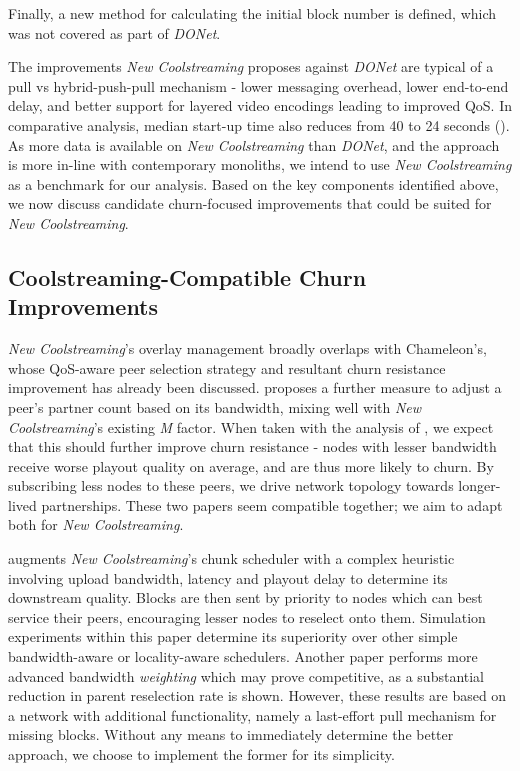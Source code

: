 \documentclass[12pt,a4paper]{article}
\begin{document}
Finally, a new method for calculating the initial block number is defined, which was not covered as part of \textit{DONet}.

The improvements \textit{New Coolstreaming} proposes against \textit{DONet} are typical of a pull vs hybrid-push-pull mechanism - lower messaging overhead, lower end-to-end delay, and better support for layered video encodings leading to improved QoS. In comparative analysis, median start-up time also reduces from 40 to 24 seconds (\cite{Li2007}). As more data is available on \textit{New Coolstreaming} than \textit{DONet}, and the approach is more in-line with contemporary monoliths, we intend to use \textit{New Coolstreaming} as a benchmark for our analysis. Based on the key components identified above, we now discuss candidate churn-focused improvements that could be suited for \textit{New Coolstreaming}.

\subsection{Coolstreaming-Compatible Churn Improvements} \label{litreview:specifics}
\textit{New Coolstreaming}'s overlay management broadly overlaps with Chameleon's, whose QoS-aware peer selection strategy and resultant churn resistance improvement has already been discussed. \cite{Wang2013} proposes a further measure to adjust a peer's partner count based on its bandwidth, mixing well with \textit{New Coolstreaming}'s existing \textit{M} factor. When taken with the analysis of \cite{Vassilakis2010}, we expect that this should further improve churn resistance - nodes with lesser bandwidth receive worse playout quality on average, and are thus more likely to churn. By subscribing less nodes to these peers, we drive network topology towards longer-lived partnerships. These two papers seem compatible together; we aim to adapt both for \textit{New Coolstreaming}.

\cite{Ho2014} augments \textit{New Coolstreaming}'s chunk scheduler with a complex heuristic involving upload bandwidth, latency and playout delay to determine its downstream quality. Blocks are then sent by priority to nodes which can best service their peers, encouraging lesser nodes to reselect onto them. Simulation experiments within this paper determine its superiority over other simple bandwidth-aware or locality-aware schedulers. Another paper \cite{Li2010} performs more advanced bandwidth \textit{weighting} which may prove competitive, as a substantial reduction in parent reselection rate is shown. However, these results are based on a network with additional functionality, namely a last-effort pull mechanism for missing blocks. Without any means to immediately determine the better approach, we choose to implement the former for its simplicity.
\end{document}
